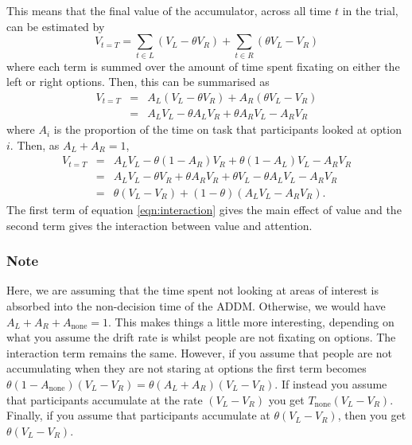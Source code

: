 \documentclass[doc, a4paper, apacite]{apa6}
\begin{document}
 This means that the final value of the accumulator, across all time $t$ in the trial, can be estimated by 
 \begin{equation}
 	V_{t=T} = \sum_{t \in L} \left(V_L - \theta V_R\right) + \sum_{t \in R}	\left(\theta V_L - V_R\right) 
 \end{equation}
 where each term is summed over the amount of time spent fixating on either the left or right options. Then, this can be summarised as 
 \begin{eqnarray}	
 	V_{t=T}&=& A_L\left(V_L -\theta V_R\right) + A_R \left(\theta V_L - V_R \right)\\
 	&=& A_L V_L - \theta A_L V_R + \theta A_R V_L - A_R V_R
 \end{eqnarray}
 where $A_i$ is the proportion of the time on task that participants looked at option $i$. Then, as $A_L + A_R = 1$, 
 \begin{eqnarray}
 	V_{t=T} &=& A_L V_L -\theta(1-A_R)V_R + \theta(1-A_L) V_L - A_R V_R \\
 		  &=& A_L V_L -\theta V_R + \theta A_R V_R + \theta V_L - \theta A_L V_L - A_R V_R \\
 		  &=& \theta(V_L - V_R) + (1-\theta)(A_L V_L - A_R V_R). \label{eqn:interaction}
 \end{eqnarray}
 The first term of equation \ref{eqn:interaction} gives the main effect of value and the second term gives the interaction between value and attention. 
 
\subsubsection{Note}
Here, we are assuming that the time spent not looking at areas of interest is absorbed into the non-decision time of the ADDM. Otherwise, we would have $A_L + A_R + A_\text{none} = 1 $. This makes things a little more interesting, depending on what you assume the drift rate is whilst people are not fixating on options. The interaction term remains the same. However, if you assume that people are not accumulating when they are not staring at options the first term becomes $\theta(1-A_\text{none})(V_L-V_R)=\theta(A_L + A_R)(V_L - V_R)$. If instead you assume that participants accumulate at the rate $(V_L-V_R)$ you get $T_\text{none}(V_L-V_R)$. Finally, if you assume that participants accumulate at $\theta(V_L-V_R)$, then you get $\theta (V_L - V_R)$. 
\end{document}
